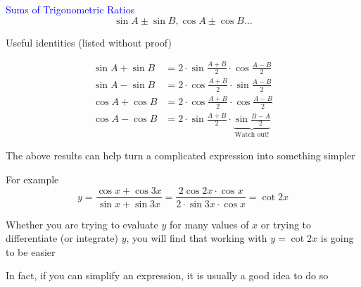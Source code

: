 \documentclass[14pt,fleqn]{extarticle}
\begin{document}
\begin{skill}
\begin{narrow}
\textcolor{blue}{Sums of Trigonometric Ratios}
\[ \sin A \pm \sin B, \cos A \pm \cos B \ldots \]
\end{narrow}
%

\reason

Useful identities (listed without proof) 

%
\begin{align}
  \sin A + \sin B &= 2\cdot\sin\frac{A+B}{2}\cdot\cos\frac{A-B}{2} \\
  \sin A - \sin B &= 2\cdot\cos\frac{A+B}{2}\cdot\sin\frac{A-B}{2}  \\
  \cos A + \cos B &= 2\cdot\cos\frac{A+B}{2}\cdot\cos\frac{A-B}{2} \\
  \cos A - \cos B &= 2\cdot\sin\frac{A+B}{2}\cdot\underbrace{\sin\frac{B-A}{2}}_{\text{Watch out!}}
\end{align}

The above results can help turn a complicated expression into something simpler \newline 

For example 
\small\[y = \frac{\cos x + \cos 3x}{\sin x + \sin 3x} = \frac{2\cos 2x\cdot \cos x}{2\cdot \sin 3x\cdot \cos x} = \cot 2x\]\normalsize

Whether you are trying to evaluate $y$ for many values of $x$ or trying to differentiate (or integrate) $y$, you will find that working with $y=\cot 2x$ is going to be easier\newline 

In fact, if you can simplify an expression, it is usually a good idea to do so

\end{skill}
\end{document}
